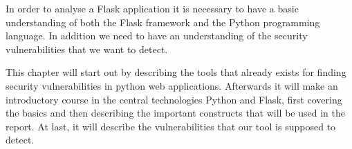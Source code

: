 In order to analyse a Flask application it is necessary to have a basic understanding of both the Flask framework and the Python programming language.
In addition we need to have an understanding of the security vulnerabilities that we want to detect.

This chapter will start out by describing the tools that already exists for finding security vulnerabilities in python web applications.
Afterwards it will make an introductory course in the central technologies Python and Flask, first covering the basics and then describing the important constructs that will be used in the report.
At last, it will describe the vulnerabilities that our tool is supposed to detect.

